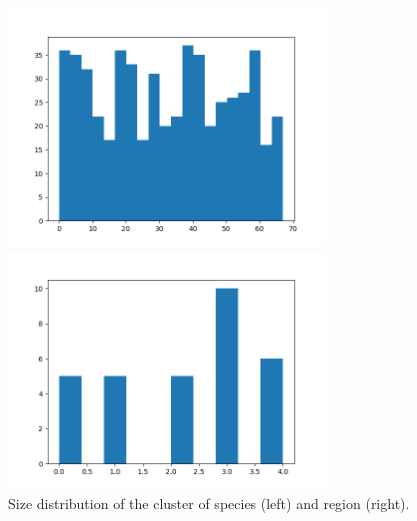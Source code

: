 \documentclass[mscthesis]{usiinfthesis}
\begin{document}
\begin{figure}[ht] 
  \label{ fig7} 
  \begin{minipage}[b]{0.5\linewidth}
    \centering
        \includegraphics[width=0.75\textwidth]{cluster_distribution_species.png}
    \vspace{4ex}
  \end{minipage}%
  \begin{minipage}[b]{0.5\linewidth}
    \centering
     \includegraphics[width=0.75\textwidth]{cluster_distribution_region.png}
    \vspace{4ex}
  \end{minipage} 
\caption{Size distribution of the cluster of species (left) and region (right).}
\label{fig:cluster_density}
\end{figure}

\end{document}
